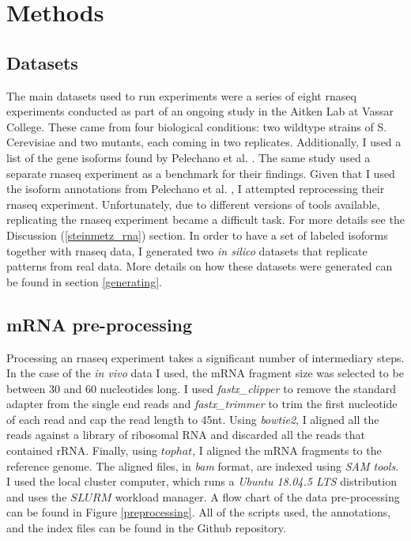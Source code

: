 \documentclass[12pt]{article}
\begin{document}
\section{Methods}
\subsection{Datasets}\label{datasets}

The main datasets used to run experiments were a series of eight \acrshort{rnaseq} experiments conducted as part of an ongoing study in the Aitken Lab at Vassar College. These came from four biological conditions: two wildtype strains of S. Cerevisiae and two mutants, each coming in two replicates. Additionally, I used a list of the gene isoforms found by Pelechano et al. \cite{Pelechano2013}. The same study \cite{Pelechano2013} used a separate \cite{Wilkening2013}  \acrshort{rnaseq} experiment as a benchmark for their findings. Given that I used the isoform annotations from Pelechano et al. \cite{Pelechano2013}, I attempted reprocessing their \acrshort{rnaseq} experiment. Unfortunately, due to different versions of tools available, replicating the \acrshort{rnaseq} experiment became a difficult task. For more details see the Discussion (\ref{steinmetz_rna}) section. In order to have a set of labeled isoforms together with \acrshort{rnaseq} data, I generated two \textit{in silico} datasets that replicate patterns from real data. More details on how these datasets were generated can be found in section \ref{generating}.

\subsection{mRNA pre-processing}
Processing an \acrshort{rnaseq} experiment takes a significant number of intermediary steps. In the case of the \textit{in vivo} data I used, the mRNA fragment size was selected to be between 30 and 60 nucleotides long. I used \textit{fastx\_clipper} to remove the standard adapter from the single end reads and \textit{fastx\_trimmer}  to trim the first nucleotide of each read and cap the read length to 45nt. Using \textit{bowtie2}, I aligned all the reads against a library of ribosomal RNA and discarded all the reads that  contained rRNA. Finally, using $tophat$, I aligned the mRNA fragments to the reference genome. The aligned files, in \textit{bam} format, are indexed using \textit{SAM tools}. I used the local cluster computer, which runs a \textit{Ubuntu 18.04.5 LTS} distribution and uses the $SLURM$ workload manager. A flow chart of the data pre-processing can be found in Figure \ref{preprocessing}. All of the scripts used, the annotations, and the index files can be found in the Github repository. 
\end{document}
